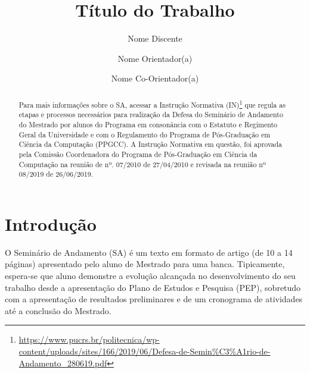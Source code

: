 \documentclass[sigconf]{acmart}
\begin{document}
\title{Título do Trabalho}

\author{Nome Discente}

\author{Nome Orientador(a)}

\author{Nome Co-Orientador(a)}

\renewcommand{\shortauthors}{Nome Discente}

\begin{abstract}
Para mais informações sobre o SA, acessar a Instrução Normativa (IN)\footnote{\url{https://www.pucrs.br/politecnica/wp-content/uploads/sites/166/2019/06/Defesa-de-Semin\%C3\%A1rio-de-Andamento_280619.pdf}} que regula as etapas e processos necessários para realização da Defesa do Seminário de Andamento do Mestrado por alunos do Programa em consonância com o Estatuto e Regimento Geral da Universidade e com o Regulamento do Programa de Pós-Graduação em Ciência da Computação (PPGCC). A Instrução Normativa em questão, foi aprovada pela Comissão Coordenadora do Programa de Pós-Graduação em Ciência da Computação na reunião de nº. 07/2010 de 27/04/2010 e revisada na reunião nº 08/2019 de 26/06/2019.
\end{abstract}


\maketitle

\section{\label{sec:secao1}Introdução}
O Seminário de Andamento (SA) é um texto em formato de artigo (de 10 a 14 páginas) apresentado
pelo aluno de Mestrado para uma banca. Tipicamente, espera-se que aluno demonstre a evolução
alcançada no desenvolvimento do seu trabalho desde a apresentação do Plano de Estudos e
Pesquisa (PEP), sobretudo com a apresentação de resultados preliminares e de um cronograma de
atividades até a conclusão do Mestrado.
\end{document}
